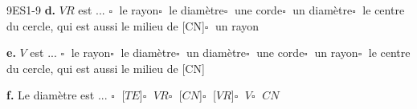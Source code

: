 \documentclass[a4paper,12pt]{report}
\begin{document}
\begin{EXO}{}{9ES1-9}
\medskip
\textbf {d.} $VR$ est ...	$\square\;$ le rayon\qquad $\square\;$ le diamètre\qquad $\square\;$ une corde\qquad $\square\;$ un diamètre\qquad $\square\;$ le centre du cercle, qui est aussi le milieu de [CN]\qquad $\square\;$ un rayon\qquad 

\medskip
\textbf {e.} $V$ est ...	$\square\;$ le rayon\qquad $\square\;$ le diamètre\qquad $\square\;$ un diamètre\qquad $\square\;$ une corde\qquad $\square\;$ un rayon\qquad $\square\;$ le centre du cercle, qui est aussi le milieu de [CN]\qquad 

\medskip
\textbf {f.} Le diamètre est ...	$\square\;$ [$TE$]\qquad $\square\;$ $VR$\qquad $\square\;$ [$CN$]\qquad $\square\;$ [$VR$]\qquad $\square\;$ $V$\qquad $\square\;$ $CN$\qquad 

\medskip

\end{EXO}
\end{document}
